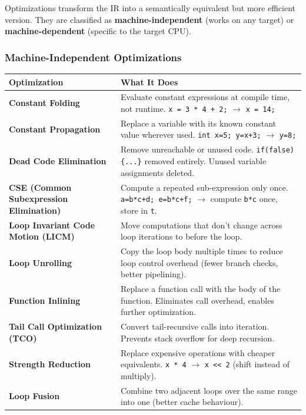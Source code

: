 \documentclass[11pt,a4paper]{article}
\newcommand{\code}[1]{\texttt{\small\colorbox{codebg}{\color{codekw}#1}}}
\newcommand{\term}[1]{\textbf{\color{darkblue}#1}}
\begin{document}
Optimizations transform the IR into a semantically equivalent but more efficient version. They are classified as \textbf{machine-independent} (works on any target) or \textbf{machine-dependent} (specific to the target CPU).

\subsubsection{Machine-Independent Optimizations}

\begin{center}
\begin{tabular}{L{5cm} L{8.5cm}}
\toprule
\textbf{Optimization} & \textbf{What It Does} \\
\midrule
\term{Constant Folding} & Evaluate constant expressions at compile time, not runtime. \code{x = 3 * 4 + 2;} $\to$ \code{x = 14;} \\[4pt]
\term{Constant Propagation} & Replace a variable with its known constant value wherever used. \code{int x=5; y=x+3;} $\to$ \code{y=8;} \\[4pt]
\term{Dead Code Elimination} & Remove unreachable or unused code. \code{if(false)\{...\}} removed entirely. Unused variable assignments deleted. \\[4pt]
\term{CSE (Common Subexpression Elimination)} & Compute a repeated sub-expression only once. \code{a=b*c+d; e=b*c+f;} $\to$ compute \code{b*c} once, store in \code{t}. \\[4pt]
\term{Loop Invariant Code Motion (LICM)} & Move computations that don't change across loop iterations to before the loop. \\[4pt]
\term{Loop Unrolling} & Copy the loop body multiple times to reduce loop control overhead (fewer branch checks, better pipelining). \\[4pt]
\term{Function Inlining} & Replace a function call with the body of the function. Eliminates call overhead, enables further optimization. \\[4pt]
\term{Tail Call Optimization (TCO)} & Convert tail-recursive calls into iteration. Prevents stack overflow for deep recursion. \\[4pt]
\term{Strength Reduction} & Replace expensive operations with cheaper equivalents. \code{x * 4} $\to$ \code{x << 2} (shift instead of multiply). \\[4pt]
\term{Loop Fusion} & Combine two adjacent loops over the same range into one (better cache behaviour). \\
\bottomrule
\end{tabular}
\end{center}
\end{document}
